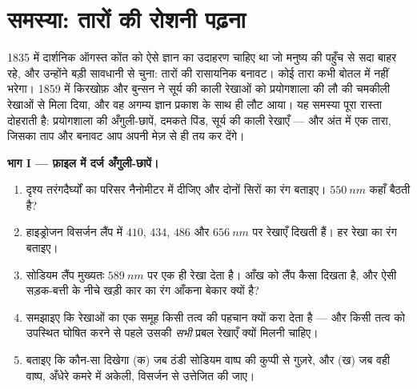 \section{समस्या: तारों की रोशनी पढ़ना}

\begin{problem}
\label{pb:g10:light-spectra:1}
1835 में दार्शनिक ऑगस्त कोंत को ऐसे ज्ञान का उदाहरण चाहिए था जो मनुष्य
की पहुँच से सदा बाहर रहे, और उन्होंने बड़ी सावधानी से चुना: तारों की
रासायनिक बनावट। कोई तारा कभी बोतल में नहीं भरेगा। 1859 में किरखोफ़ और
बुन्सन ने सूर्य की काली रेखाओं को प्रयोगशाला की लौ की चमकीली रेखाओं से
मिला दिया, और वह अगम्य ज्ञान प्रकाश के साथ ही लौट आया। यह समस्या पूरा
रास्ता दोहराती है: प्रयोगशाला की अँगुली-छापें, दमकते पिंड, सूर्य की
काली रेखाएँ --- और अंत में एक तारा, जिसका ताप और बनावट आप अपनी मेज़ से
ही तय कर देंगे।

\medskip
\noindent\textbf{भाग I --- फ़ाइल में दर्ज अँगुली-छापें।}
\begin{enumerate}
  \item दृश्य तरंगदैर्घ्यों का परिसर नैनोमीटर में दीजिए और
        दोनों सिरों का रंग बताइए। $\qty{550}{nm}$ कहाँ बैठती है?
  \item हाइड्रोजन विसर्जन लैंप में $410$, $434$, $486$ और $\qty{656}{nm}$
        पर रेखाएँ दिखती हैं। हर रेखा का रंग बताइए।
  \item सोडियम लैंप मुख्यतः $\qty{589}{nm}$ पर एक ही रेखा देता है। आँख को लैंप
        कैसा दिखता है, और ऐसी सड़क-बत्ती के नीचे खड़ी कार का रंग
        आँकना बेकार क्यों है?
  \item समझाइए कि  रेखाओं का एक समूह किसी तत्व की
        पहचान क्यों करा देता है --- और किसी तत्व को उपस्थित घोषित करने
        से पहले उसकी \emph{सभी} प्रबल रेखाएँ क्यों मिलनी चाहिए।
  \item बताइए कि कौन-सा  दिखेगा (क) जब
         ठंडी सोडियम वाष्प की कुप्पी से गुज़रे,
        और (ख) जब वही वाष्प, अँधेरे कमरे में अकेली, विसर्जन से
        उत्तेजित की जाए।
\end{enumerate}


\end{problem}
